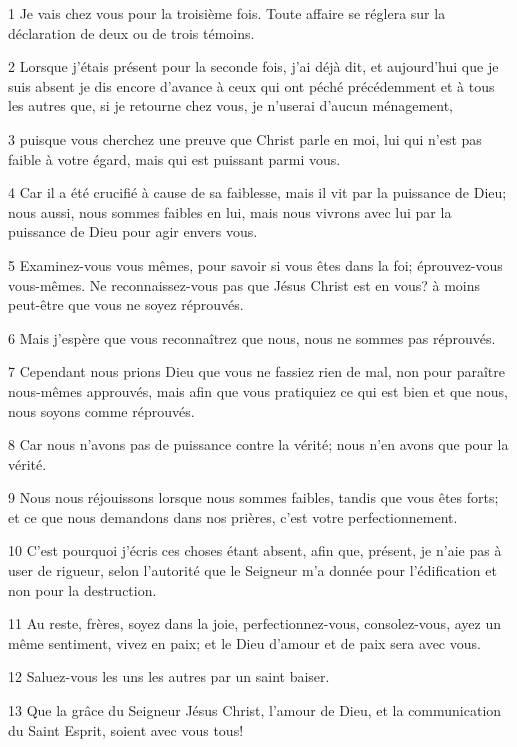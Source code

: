 \par 1 Je vais chez vous pour la troisième fois. Toute affaire se réglera sur la déclaration de deux ou de trois témoins.
\par 2 Lorsque j'étais présent pour la seconde fois, j'ai déjà dit, et aujourd'hui que je suis absent je dis encore d'avance à ceux qui ont péché précédemment et à tous les autres que, si je retourne chez vous, je n'userai d'aucun ménagement,
\par 3 puisque vous cherchez une preuve que Christ parle en moi, lui qui n'est pas faible à votre égard, mais qui est puissant parmi vous.
\par 4 Car il a été crucifié à cause de sa faiblesse, mais il vit par la puissance de Dieu; nous aussi, nous sommes faibles en lui, mais nous vivrons avec lui par la puissance de Dieu pour agir envers vous.
\par 5 Examinez-vous vous mêmes, pour savoir si vous êtes dans la foi; éprouvez-vous vous-mêmes. Ne reconnaissez-vous pas que Jésus Christ est en vous? à moins peut-être que vous ne soyez réprouvés.
\par 6 Mais j'espère que vous reconnaîtrez que nous, nous ne sommes pas réprouvés.
\par 7 Cependant nous prions Dieu que vous ne fassiez rien de mal, non pour paraître nous-mêmes approuvés, mais afin que vous pratiquiez ce qui est bien et que nous, nous soyons comme réprouvés.
\par 8 Car nous n'avons pas de puissance contre la vérité; nous n'en avons que pour la vérité.
\par 9 Nous nous réjouissons lorsque nous sommes faibles, tandis que vous êtes forts; et ce que nous demandons dans nos prières, c'est votre perfectionnement.
\par 10 C'est pourquoi j'écris ces choses étant absent, afin que, présent, je n'aie pas à user de rigueur, selon l'autorité que le Seigneur m'a donnée pour l'édification et non pour la destruction.
\par 11 Au reste, frères, soyez dans la joie, perfectionnez-vous, consolez-vous, ayez un même sentiment, vivez en paix; et le Dieu d'amour et de paix sera avec vous.
\par 12 Saluez-vous les uns les autres par un saint baiser.
\par 13 Que la grâce du Seigneur Jésus Christ, l'amour de Dieu, et la communication du Saint Esprit, soient avec vous tous!


